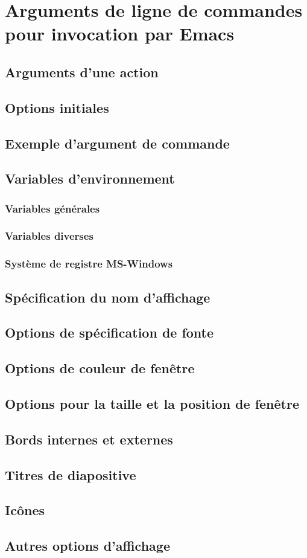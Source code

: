 \chapter{Arguments de ligne de commandes pour invocation par
  Emacs}\label{AppC} 
\section{Arguments d'une action}\label{AppCsec1}
\section{Options initiales}\label{AppCsec2}
\section{Exemple d'argument de commande}\label{AppCsec3}
\section{Variables d'environnement}\label{AppCsec4}
\subsection{Variables générales}\label{AppCsec4subsec1}
\subsection{Variables diverses}\label{AppCsec4subsec2}
\subsection{Système de registre MS-Windows}\label{AppCsec4subsec3}
\section{Spécification du nom d'affichage}\label{AppCsec5}
\section{Options de spécification de fonte}\label{AppCsec6}
\section{Options de couleur de fenêtre}\label{AppCsec7}
\section{Options pour la taille et la position de
  fenêtre}\label{AppCsec8}
\section{Bords internes et externes}\label{AppCsec9}
\section{Titres de diapositive}\label{AppCsec10}
\section{Icônes}\label{AppCsec11}
\section{Autres options d'affichage}\label{AppCsec12}
